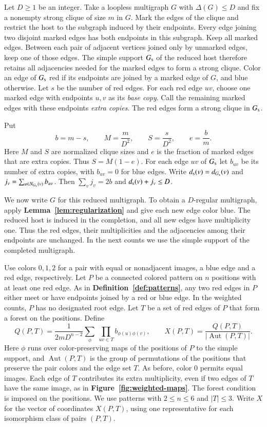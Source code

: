 \documentclass[preprint,11pt,numbers]{elsarticle-arxiv}
\numberwithin{equation}{section}
\theoremstyle{definition}
\begin{document}
Let $D\geq1$ be an integer. Take a loopless multigraph $G$ with
$\Delta(G)\leq D$ and fix a
nonempty strong clique of size $m$ in $G$. Mark the edges of the clique
and restrict the host to the subgraph induced by their endpoints.
Every edge joining two disjoint marked edges has both endpoints in this
subgraph. Keep all marked edges. Between each pair of adjacent vertices joined
only by unmarked edges, keep one of those edges. The simple support $G_{\rm s}$ of the reduced
host therefore retains all adjacencies needed for the marked edges to
form a strong clique. Color an edge of $G_{\rm s}$ red if its endpoints are joined by a
marked edge of $G$, and blue otherwise. Let $s$ be the number of red
edges. For each red edge $uv$, choose one marked edge with endpoints
$u,v$ as its \emph{base copy}. Call the remaining marked edges with
these endpoints \emph{extra copies}. The red edges form a strong
clique in $G_{\rm s}$.

Put
\[
 b=m-s,\qquad M=\frac{m}{D^2},\qquad S=\frac{s}{D^2},
 \qquad e=\frac{b}{m}.
\]
Here $M$ and $S$ are normalized clique sizes and $e$ is the fraction
of marked edges that are extra copies. Thus $S=M(1-e)$. For each edge $uv$ of $G_{\rm s}$ let $b_{uv}$ be its
number of extra copies, with $b_{uv}=0$ for blue edges. Write
$d_{\rm s}(v)=d_{G_{\rm s}}(v)$ and
$j_v=\sum_{u\in N_{G_{\rm s}}(v)}b_{uv}$.
Then $\sum_v j_v=2b$ and $d_{\rm s}(v)+j_v\le D$.

We now write $G$ for this reduced multigraph. To obtain a
$D$-regular multigraph, apply \textbf{Lemma~\ref{lem:regularization}} and give each new edge
color blue. The reduced host is induced in the completion, and all
new edges have multiplicity one. Thus the red edges, their
multiplicities and the adjacencies among their endpoints are
unchanged. In the next counts we use the simple support of the
completed multigraph.

Use colors $0,1,2$ for a pair with equal or nonadjacent images,
a blue edge and a red edge, respectively. Let $P$ be a connected colored pattern on $n$ positions
with at least one red edge. As in \textbf{Definition~\ref{def:patterns}},
any two red edges in $P$ either meet or have endpoints joined by a red
or blue edge. In the weighted counts, $P$ has no designated root edge.
Let $T$ be a set of red edges of $P$ that form a forest on the positions.
Define
\[
 Q(P,T)=\frac{1}{2mD^{n-2}}
       \sum_{\phi}\ \prod_{uv\in T} b_{\phi(u)\phi(v)},
 \qquad
 X(P,T)=\frac{Q(P,T)}{|\operatorname{Aut}(P,T)|}.
\]
Here $\phi$ runs over color-preserving maps of the positions of $P$
to the simple support, and $\operatorname{Aut}(P,T)$ is the group of
permutations of the positions that preserve the pair colors and the
edge set $T$. As before, color $0$ permits equal images. Each edge
of $T$ contributes its extra multiplicity, even if two edges of $T$
have the same image, as in \textbf{Figure~\ref{fig:weighted-maps}}.
The forest condition is imposed on the positions. We use patterns
with $2\le n\le6$ and $|T|\le3$. Write $X$ for the vector of coordinates
$X(P,T)$, using one representative for each isomorphism class of pairs
$(P,T)$.
\end{document}
